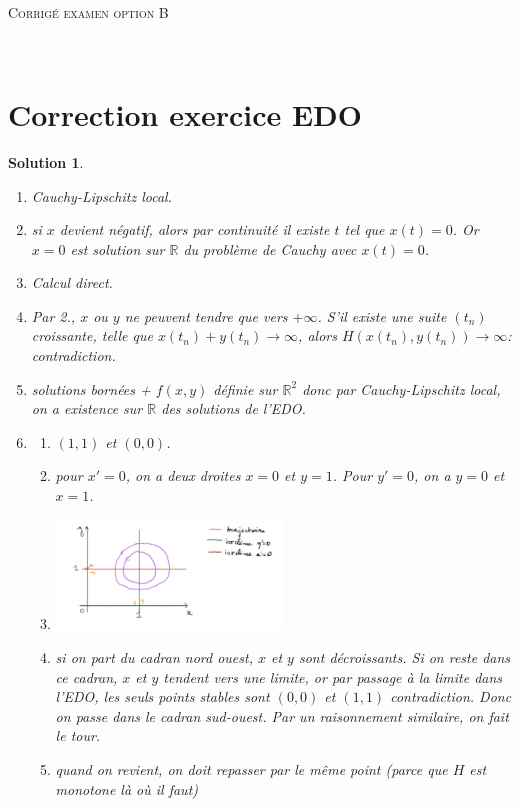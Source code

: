 \documentclass[11pt]{article}
\newcommand{\bR}{\mathbb R}
\theoremstyle{exostyle}
\newtheorem{solution}{Solution}
\begin{document}
\newpage

\noindent {\rule{\textwidth}{.2mm}}\\[-5mm]
\begin{center}
{\large \textsc{Corrigé examen option B} }\\[-5mm]
\end{center}
\noindent {\rule{\textwidth}{.2mm}}\\[1cm]

\section*{Correction exercice EDO}

\begin{solution}
  \begin{enumerate}
    \item Cauchy-Lipschitz local.
    \item si $x$ devient négatif, alors par continuité il existe $t$ tel que $x(t) = 0$. Or $x = 0$ est solution sur $\bR$ du problème de Cauchy avec $x(t)=0$.
    \item Calcul direct.
    \item Par 2., $x$ ou $y$ ne peuvent tendre que vers $+\infty$. S’il existe une suite $(t_n)$ croissante, telle que $x(t_n)+y(t_n) \to \infty$, alors $H(x(t_n),y(t_n)) \to \infty$: contradiction.
    \item solutions bornées + $f(x,y)$ définie sur $\bR^2$ donc par Cauchy-Lipschitz local, on a existence sur $\bR$ des solutions de l’EDO.
    \item \begin{enumerate}
      \item $(1,1)$ et $(0,0)$.
      \item pour $x'=0$, on a deux droites $x=0$ et $y=1$. Pour $y'=0$, on a $y=0$ et $x=1$.
      \item \includegraphics[width=0.5\textwidth]{portrait_phase.jpg}
      \item si on part du cadran nord ouest, $x$ et $y$ sont décroissants. Si on reste dans ce cadran, $x$ et $y$ tendent vers une limite, or par passage à la limite dans l’EDO, les seuls points stables sont $(0,0)$ et $(1,1)$ contradiction.
      Donc on passe dans le cadran sud-ouest. Par un raisonnement similaire, on fait le tour.
      \item quand on revient, on doit repasser par le même point (parce que $H$ est monotone là où il faut)
    \end{enumerate}
  \end{enumerate}
\end{solution}
\end{document}
